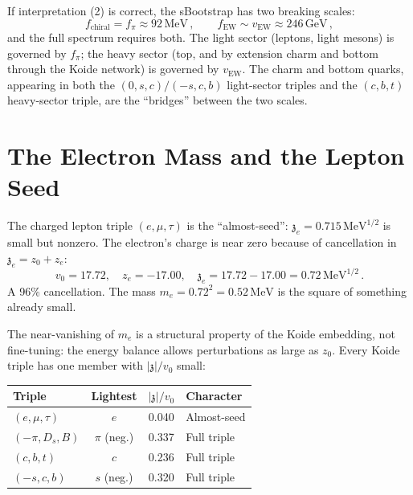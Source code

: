 \documentclass[12pt,a4paper]{article}
\newcommand{\MeV}{\,\text{MeV}}
\newcommand{\GeV}{\,\text{GeV}}
\newcommand{\zch}{\mathfrak{z}}
\begin{document}
If interpretation (2) is correct, the sBootstrap has two breaking 
scales:
\begin{equation}
f_{\text{chiral}} = f_\pi \approx 92\MeV\,, \qquad
f_{\text{EW}} \sim v_{\text{EW}} \approx 246\GeV\,,
\end{equation}
and the full spectrum requires both. The light sector (leptons, 
light mesons) is governed by $f_\pi$; the heavy sector (top, and 
by extension charm and bottom through the Koide network) is 
governed by $v_{\text{EW}}$. The charm and bottom quarks, 
appearing in both the $(0,s,c)/(-s,c,b)$ light-sector triples 
and the $(c,b,t)$ heavy-sector triple, are the ``bridges'' 
between the two scales.

\section{The Electron Mass and the Lepton Seed}
\label{sec:electron}

The charged lepton triple $(e, \mu, \tau)$ is the ``almost-seed'': 
$\zch_e = 0.715\MeV^{1/2}$ is small but nonzero. The electron's 
charge is near zero because of cancellation in $\zch_e = z_0 + z_e$:
\begin{equation}
v_0 = 17.72, \quad z_e = -17.00, \quad 
\zch_e = 17.72 - 17.00 = 0.72\MeV^{1/2}\,.
\end{equation}
A 96\% cancellation. The mass $m_e = 0.72^2 = 0.52\MeV$ is the 
square of something already small.

The near-vanishing of $m_e$ is a structural property of the Koide 
embedding, not fine-tuning: the energy balance allows perturbations 
as large as $z_0$. Every Koide triple has one member with 
$|\zch|/v_0$ small:

\begin{center}
\begin{tabular}{lccl}
\toprule
Triple & Lightest & $|\zch|/v_0$ & Character \\
\midrule
$(e, \mu, \tau)$ & $e$ & 0.040 & Almost-seed \\
$(-\pi, D_s, B)$ & $\pi$ (neg.) & 0.337 & Full triple \\
$(c, b, t)$ & $c$ & 0.236 & Full triple \\
$(-s, c, b)$ & $s$ (neg.) & 0.320 & Full triple \\
\bottomrule
\end{tabular}
\end{center}
\end{document}
